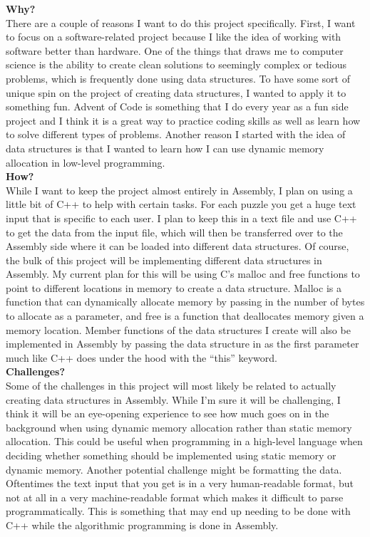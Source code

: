 \documentclass[twoside]{article}
\begin{document}
\noindent \textbf{Why?} \\
There are a couple of reasons I want to do this project specifically. First, I want to focus on a software-related project because I like the idea of working with software better than hardware. One of the things that draws me to computer science is the ability to create clean solutions to seemingly complex or tedious problems, which is frequently done using data structures. To have some sort of unique spin on the project of creating data structures, I wanted to apply it to something fun. Advent of Code is something that I do every year as a fun side project and I think it is a great way to practice coding skills as well as learn how to solve different types of problems. Another reason I started with the idea of data structures is that I wanted to learn how I can use dynamic memory allocation in low-level programming. \\

\noindent \textbf{How?} \\
While I want to keep the project almost entirely in Assembly, I plan on using a little bit of C++ to help with certain tasks. For each puzzle you get a huge text input that is specific to each user. I plan to keep this in a text file and use C++ to get the data from the input file, which will then be transferred over to the Assembly side where it can be loaded into different data structures. Of course, the bulk of this project will be implementing different data structures in Assembly. My current plan for this will be using C’s malloc and free functions to point to different locations in memory to create a data structure. Malloc is a function that can dynamically allocate memory by passing in the number of bytes to allocate as a parameter, and free is a function that deallocates memory given a memory location. Member functions of the data structures I create will also be implemented in Assembly by passing the data structure in as the first parameter much like C++ does under the hood with the “this” keyword. \\

\noindent \textbf{Challenges?} \\
Some of the challenges in this project will most likely be related to actually creating data structures in Assembly. While I’m sure it will be challenging, I think it will be an eye-opening experience to see how much goes on in the background when using dynamic memory allocation rather than static memory allocation. This could be useful when programming in a high-level language when deciding whether something should be implemented using static memory or dynamic memory. Another potential challenge might be formatting the data. Oftentimes the text input that you get is in a very human-readable format, but not at all in a very machine-readable format which makes it difficult to parse programmatically. This is something that may end up needing to be done with C++ while the algorithmic programming is done in Assembly.
\end{document}
